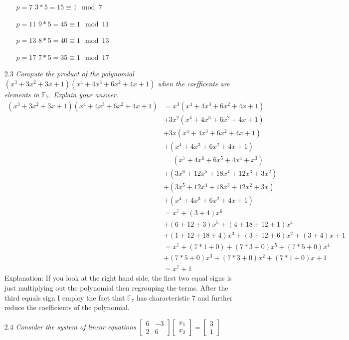 \documentclass[12pt, letterpaper]{article}
\begin{document}
\begin{enumerate}
	\begin{enumerate}
		\item[$p=7$] $3*5 = 15 \equiv 1 \mod{7}$
		\item[$p=11$] $ 9*5 = 45 \equiv 1 \mod{11}$
		\item[$p=13$] $8*5 = 40 \equiv 1 \mod{13}$
		\item[$p=17$] $7*5 = 35 \equiv 1 \mod{17}$
	\end{enumerate}
	\fi
	\item[2.3]\textit{Compute the product of the polynomial  $(x^3 + 3x^2 + 3x + 1) (x^4 + 4x^3 + 6x^2 + 4x + 1)$ when the coefficents are elements in $\mathbb{F}_7$.  Explain your answer. }\\
	\begin{align*}
	(x^3 + 3x^2 + 3x + 1) (x^4 + 4x^3 + 6x^2 + 4x + 1) &= 
	x^3(x^4 + 4x^3 + 6x^2 + 4x + 1)\\ &+ 3x^2(x^4 + 4x^3 + 6x^2 + 4x + 1)\\
	&+ 3x(x^4 + 4x^3 + 6x^2 + 4x + 1)\\ &+ (x^4 + 4x^3 + 6x^2 + 4x + 1)\\
	&= (x^7 + 4x^6 + 6x^5 + 4x^4 + x^3)\\ &+ (3x^6 + 12x^5 + 18x^4 + 12x^3 + 3x^2)\\
	&+ (3x^5 + 12x^4 + 18x^3 + 12x^2 + 3x)\\ &+ (x^4 + 4x^3 + 6x^2 + 4x + 1)\\
	&= x^7 +(3 + 4)x^6\\ &+ (6 + 12 + 3)x^5 + (4+ 18 + 12 + 1)x^4\\
	&+ (1+12 + 18 + 4)x^3 + (3+12+6)x^2 + (3+4)x + 1\\
	&= x^7 + (7*1 + 0) + (7*3 + 0)x^5 + (7*5 + 0)x^4\\ &+ (7*5 + 0)x^3 + (7*3 + 0)x^2 +(7*1 + 0)x + 1\\
	&= x^7 + 1
	\end{align*}
	Explanation: If you look at the right hand side, the first two equal signs is 
	just multiplying out the polynomial then regrouping the terms.
	After the third equals sign I employ the fact that $\mathbb{F}_7$ has 
	characteristic 7 and further reduce the coefficients of the polynomial.  
	\item[2.4]\textit{Consider the system of linear equations 
	$\begin{bmatrix}6 & -3\\ 2 & 6 \end{bmatrix} \begin{bmatrix}x_1 \\x_2 \end{bmatrix} = \begin{bmatrix} 3 \\ 1\end{bmatrix}	 $}\\

\end{enumerate}
\end{document}
